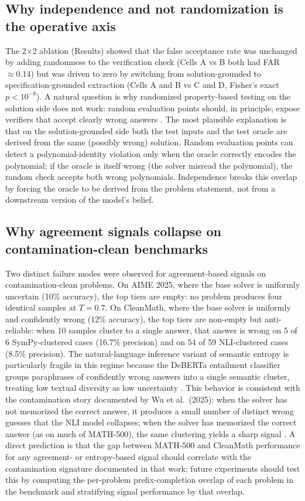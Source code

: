 \documentclass[11pt]{article}
\begin{document}
\subsection{Why independence and not randomization is the operative axis}

The 2$\times$2 ablation (Results) showed that the false acceptance rate was unchanged by adding randomness to the verification check (Cells A vs B both had FAR $\approx 0.14$) but was driven to zero by switching from solution-grounded to specification-grounded extraction (Cells A and B vs C and D, Fisher's exact $p<10^{-8}$). A natural question is why randomized property-based testing on the solution side does not work: random evaluation points should, in principle, expose verifiers that accept clearly wrong answers \citep{quickcheck2000, pgs2025}. The most plausible explanation is that on the solution-grounded side both the test inputs and the test oracle are derived from the same (possibly wrong) solution. Random evaluation points can detect a polynomial-identity violation only when the oracle correctly encodes the polynomial; if the oracle is itself wrong (the solver misread the polynomial), the random check accepts both wrong polynomials. Independence breaks this overlap by forcing the oracle to be derived from the problem statement, not from a downstream version of the model's belief.

\subsection{Why agreement signals collapse on contamination-clean benchmarks}

Two distinct failure modes were observed for agreement-based signals on contamination-clean problems. On AIME 2025, where the base solver is uniformly uncertain (10\% accuracy), the top tiers are empty: no problem produces four identical samples at $T=0.7$. On CleanMath, where the base solver is uniformly and confidently wrong (12\% accuracy), the top tiers are non-empty but anti-reliable: when 10 samples cluster to a single answer, that answer is wrong on 5 of 6 SymPy-clustered cases (16.7\% precision) and on 54 of 59 NLI-clustered cases (8.5\% precision). The natural-language inference variant of semantic entropy is particularly fragile in this regime because the DeBERTa entailment classifier groups paraphrases of confidently wrong answers into a single semantic cluster, treating low textual diversity as low uncertainty \citep{farquhar2024nature}. This behavior is consistent with the contamination story documented by Wu et al.\ (2025): when the solver has not memorized the correct answer, it produces a small number of distinct wrong guesses that the NLI model collapses; when the solver has memorized the correct answer (as on much of MATH-500), the same clustering yields a sharp signal \citep{wu2025contam}. A direct prediction is that the gap between MATH-500 and CleanMath performance for any agreement- or entropy-based signal should correlate with the contamination signature documented in that work; future experiments should test this by computing the per-problem prefix-completion overlap of each problem in the benchmark and stratifying signal performance by that overlap.
\end{document}
